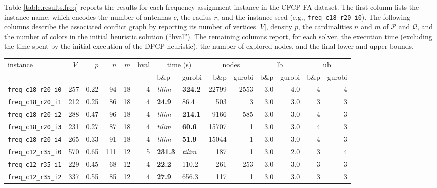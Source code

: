 \documentclass[preprint, 11pt, authoryear]{elsarticle}
\newcommand{\PP}{{\mathcal P}}
\newcommand{\QQ}{{\mathcal Q}}
\begin{document}
Table \ref{table.results.freq} reports the results for each frequency assignment instance in the CFCP-FA dataset. The first column lists the instance name, which encodes the number of antennas $c$, the radius $r$, and the instance seed (e.g., \texttt{freq\_c18\_r20\_i0}).
The following columns describe the associated conflict graph by reporting its number of vertices $|V|$, density $p$, the cardinalities $n$ and $m$ of $\PP$ and $\QQ$, and the number of colors in the initial heuristic solution (``hval''). 
The remaining columns report, for each solver, the execution time (excluding the time spent by the initial execution of the DPCP heuristic), the number of explored nodes, and the final lower and upper bounds. 

\begin{table}[]
\footnotesize
\setlength{\tabcolsep}{4pt}
\centering
\begin{tabular}{lrrrrrllrrrrrr}
\toprule
instance & $|V|$ & $p$ & $n$ & $m$ & hval & \multicolumn{2}{c}{time (s)} & \multicolumn{2}{c}{nodes} & \multicolumn{2}{c}{lb} & \multicolumn{2}{c}{ub} \\
\cmidrule(lr){7-8} \cmidrule(lr){9-10} \cmidrule(lr){11-12} \cmidrule(lr){13-14}
 &  &  &  & &  & b\&p & gurobi & b\&p & gurobi & b\&p & gurobi & b\&p & gurobi \\
\midrule
\texttt{freq\_c18\_r20\_i0} & 257 & 0.22 & 94 & 18 & 4 & \textit{tilim} & \textbf{324.2} & 22799 & 2553 & 3.0 & 4.0 & 4 & 4 \\
\texttt{freq\_c18\_r20\_i1} & 212 & 0.25 & 86 & 18 & 4 & \textbf{24.9} & 86.4 & 503 & 3 & 3.0 & 3.0 & 3 & 3 \\
\texttt{freq\_c18\_r20\_i2} & 288 & 0.47 & 96 & 18 & 4 & \textit{tilim} & \textbf{214.1} & 9166 & 585 & 3.0 & 3.0 & 4 & 3 \\
\texttt{freq\_c18\_r20\_i3} & 231 & 0.27 & 87 & 18 & 4 & \textit{tilim} & \textbf{60.6} & 15707 & 1 & 3.0 & 3.0 & 4 & 3 \\
\texttt{freq\_c18\_r20\_i4} & 265 & 0.33 & 91 & 18 & 4 & \textit{tilim} & \textbf{51.9 }& 15044 & 1 & 3.0 & 3.0 & 4 & 3 \\
\midrule
\texttt{freq\_c12\_r35\_i0} & 570 & 0.65 & 111 & 12 & 5 & \textbf{231.3} & \textit{tilim} & 187 & 1 & 3.0 & 2.0 & 3 & 4 \\
\texttt{freq\_c12\_r35\_i1} & 229 & 0.45 & 68 & 12 & 4 & \textbf{22.2} & 110.2 & 261 & 253 & 3.0 & 3.0 & 3 & 3 \\
\texttt{freq\_c12\_r35\_i2} & 337 & 0.55 & 85 & 12 & 4 & \textbf{27.9} & 656.3 & 117 & 1 & 3.0 & 3.0 & 3 & 3 \\

\end{tabular}
\end{table}
\end{document}
